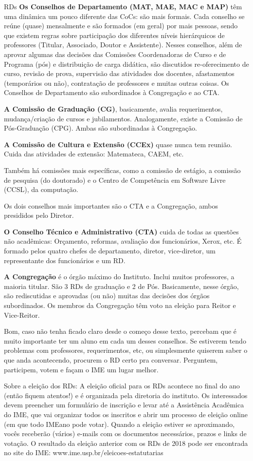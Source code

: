 \begin{subsecao}{RDs}
{\bf Os Conselhos de Departamento (MAT, MAE, MAC e MAP)} têm uma dinâmica um
pouco diferente das CoCs: são mais formais. Cada conselho se reúne (quase)
mensalmente e são formados (em geral) por mais pessoas, sendo que existem
regras sobre participação dos diferentes níveis hierárquicos de
professores (Titular, Associado, Doutor e Assistente). Nesses conselhos, além
de aprovar algumas das decisões das Comissões Coordenadoras de Curso e de
Programa (pós) e distribuição de carga didática, são discutidos re-oferecimento
de curso, revisão de prova, supervisão das atividades dos docentes,
afastamentos (temporários ou não), contratação de professores e muitas outras
coisas.
Os Conselhos de Departamento são subordinados à Congregação e ao CTA.

{\bf A Comissão de Graduação (CG)}, basicamente, avalia requerimentos,
mudança/criação de cursos e jubilamentos. Analogamente, existe a Comissão de
Pós-Graduação (CPG). Ambas são subordinadas à Congregação.

{\bf A Comissão de Cultura e Extensão (CCEx)} quase nunca tem reunião. Cuida
das atividades de extensão: Matemateca, CAEM, etc.

Também há comissões mais específicas, como a comissão de estágio, a comissão de
pesquisa (do doutorado) e o Centro de Competência em Software Livre (CCSL), da
computação.

Os dois conselhos mais importantes são o CTA e a Congregação, ambos presididos
pelo Diretor.

{\bf O Conselho Técnico e Administrativo (CTA)} cuida de todas as questões não
acadêmicas: Orçamento, reformas, avaliação dos funcionários, Xerox, etc. É
formado pelos quatro chefes de departamento, diretor, vice-diretor, um
representante dos funcionários e um RD.

{\bf A Congregação} é o órgão máximo do Instituto. Inclui muitos professores, a
maioria titular. São 3 RDs de graduação e 2 de Pós. Basicamente,
nesse órgão, são rediscutidas e aprovadas (ou não) muitas das decisões
dos órgãos subordinados. Os membros da Congregação têm voto na eleição para
Reitor e Vice-Reitor.

Bom, caso não tenha ficado claro desde o começo desse texto, percebam que é
muito importante ter um aluno em cada um desses conselhos. Se estiverem tendo
problemas com professores, requerimentos, etc, ou simplesmente quiserem saber
o que anda acontecendo, procurem o RD certo pra conversar. Perguntem,
participem, votem e façam o IME um lugar melhor.

Sobre a eleição dos RDs: A eleição oficial para os RDs acontece no final do ano
(então fiquem atentos!) e é organizada pela diretoria do instituto. Os
interessados devem preencher um formulário de inscrição e levar até a
Assistência Acadêmica do IME, que vai organizar todos os inscritos e abrir um
processo de eleição online (em que todo IMEano pode votar). Quando a eleição
estiver se aproximando, vocês receberão (vários) e-mails com os documentos
necessários, prazos e links de votação.
O resultado da eleição anterior com os RDs de 2018 pode ser encontrada no site
do IME: www.ime.usp.br/eleicoes-estatutarias

\end{subsecao}
